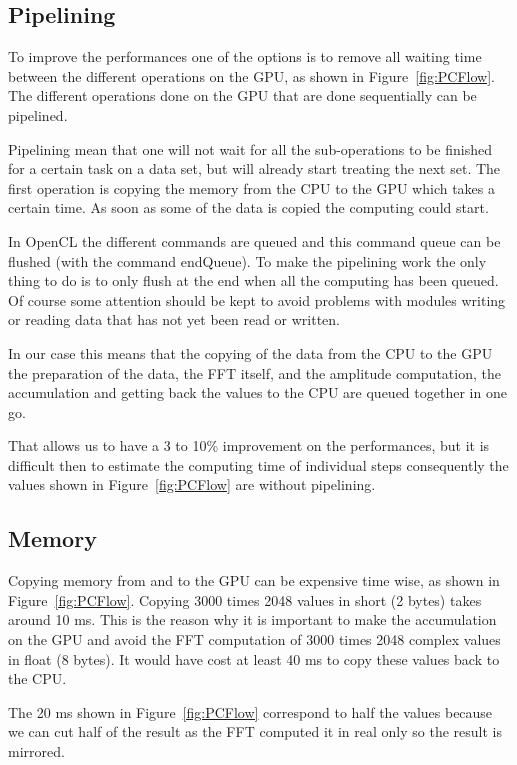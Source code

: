 \subsection{Pipelining}

To improve the performances one of the options is to remove all waiting time between the different operations on the \gls{GPU}, as shown in Figure~\ref{fig:PCFlow}. The different operations done on the \gls{GPU} that are done sequentially can be pipelined.

Pipelining mean that one will not wait for all the sub-operations to be finished for a certain task on a data set, but will already start treating the next set. The first operation is copying the memory from the \gls{CPU} to the \gls{GPU} which takes a certain time. As soon as some of the data is copied the computing could start.

In \gls{OpenCL} the different commands are queued and this command queue can be flushed (with the command endQueue). To make the pipelining work the only thing to do is to only flush at the end when all the computing has been queued. Of course some attention should be kept to avoid problems with modules writing or reading data that has not yet been read or written.

In our case this means that the copying of the data from the \gls{CPU} to the \gls{GPU} the preparation of the data, the \gls{FFT} itself, and the amplitude computation, the accumulation and getting back the values to the \gls{CPU} are queued together in one go.

That allows us to have a 3 to 10\% improvement on the performances, but it is difficult then to estimate the computing time of individual steps consequently the values shown in Figure~\ref{fig:PCFlow} are without pipelining.

\subsection{Memory}

Copying memory from and to the \gls{GPU} can be expensive time wise, as shown in Figure~\ref{fig:PCFlow}. Copying 3000 times 2048 values in short (2 bytes) takes around 10 ms. This is the reason why it is important to make the accumulation on the \gls{GPU} and avoid the \gls{FFT} computation of 3000 times 2048 complex values in float (8 bytes). It would have cost at least 40 ms to copy these values back to the \gls{CPU}. 

The 20 ms shown in Figure~\ref{fig:PCFlow} correspond to half the values because we can cut half of the result as the \gls{FFT} computed it in real only so the result is mirrored.

